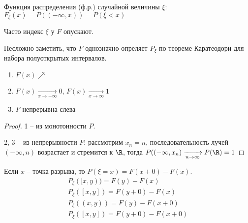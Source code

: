 \begin{Def}
Функция распределения (ф.р.) случайной величины $\xi$: $F_{\xi}(x) = P((-\infty, x)) = P(\xi < x)$
\end{Def}
\begin{Rem}
Часто индекс $\xi$ у $F$ опускают.
\end{Rem}

Несложно заметить, что $F$ однозначно опреляет $P_{\xi}$ по теореме Каратеодори для набора полуоткрытых интервалов.

\begin{theorem}

\begin{enumerate}

\item $F(x) \nearrow$
\item $F(x) \xrightarrow[x \to -\infty]{} 0$, $F(x) \xrightarrow[x \to \infty]{} 1$
\item $F$ непрерывна слева
\end{enumerate}
\end{theorem}
\begin{proof}
1 -- из монотонности $P$.

2, 3 -- из непрерывности $P$: рассмотрим $x_n = n$, последовательность лучей $(-\infty, n)$ возрастает и стремится к $\R$, тогда $P((-\infty, x_n) \xrightarrow[n \to \infty]{} P(\R) = 1$
\end{proof}

Если $x$ -- точка разрыва, то $P(\xi = x) = F(x + 0) - F(x)$.
\begin{gather*}
P_{\xi}([x, y)) = F(y) - F(x)\\
P_{\xi}([x, y]) = F(y + 0) - F(x)\\
P_{\xi}((x, y)) = F(y) - F(x + 0)\\
P_{\xi}([x, y]) = F(y + 0) - F(x + 0)
\end{gather*}

